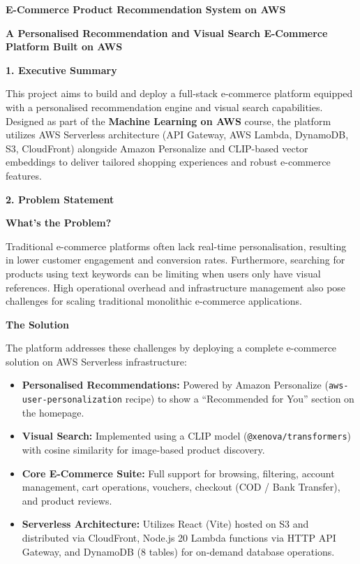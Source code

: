\vspace{0.5em}\noindent\textbf{E-Commerce Product Recommendation System on
AWS}\par

\vspace{0.5em}\noindent\textbf{A Personalised Recommendation and Visual Search E-Commerce
Platform Built on
AWS}\par

\vspace{0.5em}\noindent\textbf{1. Executive Summary}\par

This project aims to build and deploy a full-stack e-commerce platform
equipped with a personalised recommendation engine and visual search
capabilities. Designed as part of the \textbf{Machine Learning on AWS}
course, the platform utilizes AWS Serverless architecture (API Gateway,
AWS Lambda, DynamoDB, S3, CloudFront) alongside Amazon Personalize and
CLIP-based vector embeddings to deliver tailored shopping experiences
and robust e-commerce features.

\vspace{0.5em}\noindent\textbf{2. Problem Statement}\par

\vspace{0.5em}\noindent\textbf{What's the Problem?}\par

Traditional e-commerce platforms often lack real-time personalisation,
resulting in lower customer engagement and conversion rates.
Furthermore, searching for products using text keywords can be limiting
when users only have visual references. High operational overhead and
infrastructure management also pose challenges for scaling traditional
monolithic e-commerce applications.

\vspace{0.5em}\noindent\textbf{The Solution}\par

The platform addresses these challenges by deploying a complete
e-commerce solution on AWS Serverless infrastructure:

\begin{itemize}
\tightlist
\item
  \textbf{Personalised Recommendations:} Powered by Amazon Personalize
  (\texttt{aws-user-personalization} recipe) to show a ``Recommended for
  You'' section on the homepage.
\item
  \textbf{Visual Search:} Implemented using a CLIP model
  (\texttt{@xenova/transformers}) with cosine similarity for image-based
  product discovery.
\item
  \textbf{Core E-Commerce Suite:} Full support for browsing, filtering,
  account management, cart operations, vouchers, checkout (COD / Bank
  Transfer), and product reviews.
\item
  \textbf{Serverless Architecture:} Utilizes React (Vite) hosted on S3
  and distributed via CloudFront, Node.js 20 Lambda functions via HTTP
  API Gateway, and DynamoDB (8 tables) for on-demand database
  operations.
\end{itemize}

